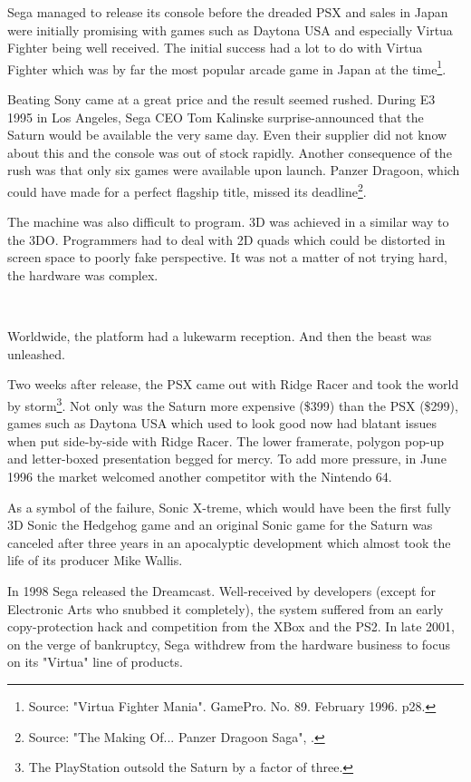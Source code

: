\vspace{-10pt}
Sega managed to release its console before the dreaded PSX and sales in Japan were initially promising with games such as Daytona USA and especially Virtua Fighter being well received. The initial success had a lot to do with Virtua Fighter which was by far the most popular arcade game in Japan at the time\footnote{Source: "Virtua Fighter Mania". GamePro. No. 89. February 1996.  p28.}.\\
\par
Beating Sony came at a great price and the result seemed rushed. During E3 1995 in Los Angeles, Sega CEO Tom Kalinske surprise-announced that the Saturn would be available the very same day. Even their supplier did not know about this and the console was out of stock rapidly. Another consequence of the rush was that only six games were available upon launch. Panzer Dragoon, which could have made for a perfect flagship title, missed its deadline\footnote{Source: "The Making Of... Panzer Dragoon Saga", .}.\\
\par The machine was also difficult to program. 3D was achieved in a similar way to the 3DO. Programmers had to deal with 2D quads which could be distorted in screen space to poorly fake perspective. It was not a matter of not trying hard, the hardware was complex.\\
\par
{}\\
\par
Worldwide, the platform had a lukewarm reception. And then the beast was unleashed.\\
\par
 Two weeks after release, the PSX came out with Ridge Racer and took the world by storm\footnote{The PlayStation outsold the Saturn by a factor of three.}. Not only was the Saturn more expensive (\$399) than the PSX (\$299), games such as Daytona USA which used to look good now had blatant issues when put side-by-side with Ridge Racer. The lower framerate, polygon pop-up and letter-boxed presentation begged for mercy. To add more pressure, in June 1996 the market welcomed another competitor with the Nintendo 64.\\
\par
As a symbol of the failure, Sonic X-treme, which would have been the first fully 3D Sonic the Hedgehog game and an original Sonic game for the Saturn was canceled after three years in an apocalyptic development which almost took the life of its producer Mike Wallis.\\
\par
In 1998 Sega released the Dreamcast. Well-received by developers (except for Electronic Arts who snubbed it completely), the system suffered from an early copy-protection hack and competition from the XBox and the PS2. In late 2001, on the verge of bankruptcy, Sega withdrew from the hardware business to focus on its "Virtua" line of products.


